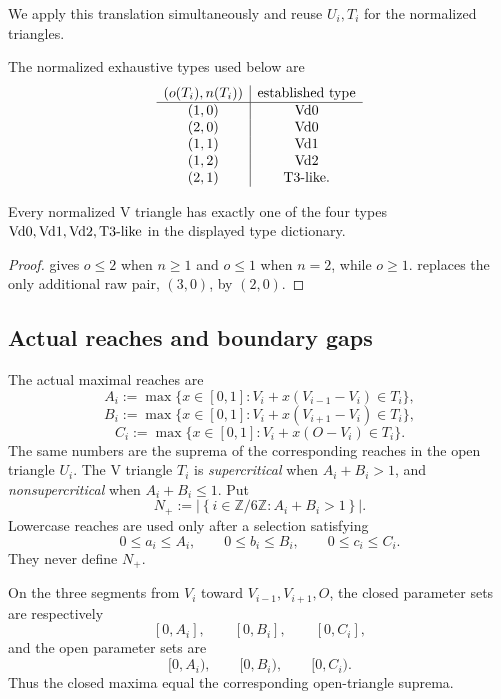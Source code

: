 We apply this translation simultaneously and reuse $U_i,T_i$ for the normalized triangles.

The normalized exhaustive types used below are
\[
\begin{array}{c|c}
(o(T_i),n(T_i))&\text{established type}\\ \hline
(1,0)&\mathrm{Vd0}\\
(2,0)&\mathrm{Vd0}\\
(1,1)&\mathrm{Vd1}\\
(1,2)&\mathrm{Vd2}\\
(2,1)&\mathrm{T3\text{-}like}.
\end{array}
\]

\begin{proposition}
\label{prop:vertex-classification}
Every normalized V triangle has exactly one of the four types
$\mathrm{Vd0},\mathrm{Vd1},\mathrm{Vd2},\mathrm{T3\text{-}like}$ in the displayed type dictionary.
\end{proposition}

\begin{proof}
 gives $o\le2$ when $n\ge1$ and $o\le1$ when
$n=2$, while $o\ge1$.   replaces the only additional raw
pair, $(3,0)$, by $(2,0)$.
\end{proof}

\subsection{Actual reaches and boundary gaps}

The actual maximal reaches are
\[
 A_i:=\max\{x\in[0,1]:V_i+x(V_{i-1}-V_i)\in T_i\},
\]
\[
 B_i:=\max\{x\in[0,1]:V_i+x(V_{i+1}-V_i)\in T_i\},
\]
\[
 C_i:=\max\{x\in[0,1]:V_i+x(O-V_i)\in T_i\}.
\]
The same numbers are the suprema of the corresponding reaches in the open
triangle $U_i$. The V triangle $T_i$ is \emph{supercritical} when
$A_i+B_i>1$, and \emph{nonsupercritical} when $A_i+B_i\le1$. Put
\begin{equation}
 N_+:=\left\lvert\left\{i\in\mathbb Z/6\mathbb Z:
 A_i+B_i>1\right\}\right\rvert.
 \label{eq:N-plus-definition}
\end{equation}
Lowercase reaches are used only after a selection satisfying
\[
 0\le a_i\le A_i,\qquad 0\le b_i\le B_i,\qquad 0\le c_i\le C_i.
\]
They never define $N_+$.

\begin{lemma}
\label{lem:reach-initial-segments}
On the three segments from $V_i$ toward $V_{i-1},V_{i+1},O$, the closed
parameter sets are respectively
\[
 [0,A_i],\qquad[0,B_i],\qquad[0,C_i],
\]
and the open parameter sets are
\[
 [0,A_i),\qquad[0,B_i),\qquad[0,C_i).
\]
Thus the closed maxima equal the corresponding open-triangle suprema.
\end{lemma}


